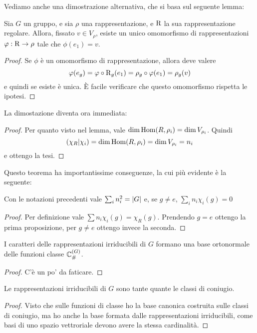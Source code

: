 Vediamo anche una dimostrazione alternativa, che si basa sul seguente lemma:
\begin{mylemma}
  Sia $G$ un gruppo, e sia $\rho$ una rappresentazione, e $\operatorname{R}$ la sua rappresentazione regolare. Allora, fissato $v\in V_\rho$, esiste un unico omomorfismo di rappresentazioni $\varphi: \operatorname{R} \rightarrow \rho$ tale che $\phi(e_1)=v$.
\end{mylemma}
\begin{proof}
  Se $\phi$ è un omomorfismo di rappresentazione, allora deve valere 
  \[
  \varphi(e_g)=\varphi \circ \operatorname{R}_g (e_1) = \rho_g \circ \varphi (e_1) = \rho_g(v)
  \]
  e quindi se esiste è unica. \`E facile verificare che questo omomorfismo rispetta le ipotesi.
\end{proof}

La dimostazione diventa ora immediata:
\begin{proof}
  Per quanto visto nel lemma, vale $\dim \operatorname{Hom}(R,\rho_i) = \dim V_{\rho_i}$. Quindi
  \[
  \left(\chi_R | \chi_i\right)= \dim \operatorname{Hom}(R,\rho_i) = \dim V_{\rho_i} = n_i
  \]
  e ottengo la tesi.
\end{proof}

Questo teorema ha importantissime conseguenze, la cui più evidente è la seguente:
\begin{myprop}
  Con le notazioni precedenti vale $\sum_i n_i^2 = \left|G\right|$ e, se $g\ne e$, $\sum_i n_i \chi_i(g)=0$
\end{myprop}
\begin{proof}
  Per definizione vale $\sum n_i \chi_i(g) = \chi_R(g)$. Prendendo $g=e$ ottengo la prima proposizione, per $g\ne e$ ottengo invece la seconda.
\end{proof}

\begin{mytheorem}
  I caratteri delle rappresentazioni irriducibili di $G$ formano una base ortonormale delle funzioni classe $\mathbb C^{(G)}_\#$.
\end{mytheorem}

\begin{proof}
  C'è un po' da faticare.
\end{proof}


\begin{mytheorem}
  Le rappresentazioni irriducibili di $G$ sono tante quante le classi di coniugio.
\end{mytheorem}

\begin{proof}
  Visto che sulle funzioni di classe ho la base canonica costruita sulle classi di coniugio, ma ho anche la base formata dalle rappresentazioni irriducibili, come basi di uno spazio vettroriale devono avere la stessa cardinalità.
\end{proof}






